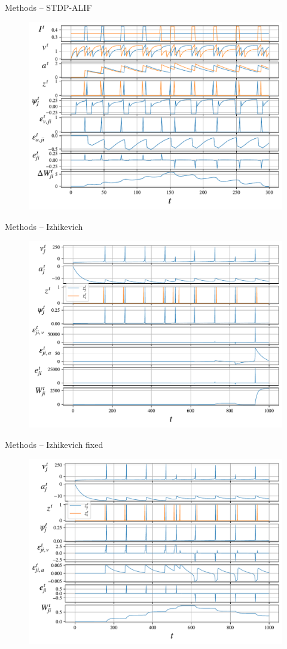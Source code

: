\documentclass[t]{beamer}
\begin{document}
\begin{frame}{Methods -- STDP-ALIF}
  \begin{figure}[!ht]
    \centering
    \includegraphics[width=.8\linewidth]{stdpalif}
  \end{figure}
\end{frame}
\begin{frame}{Methods -- Izhikevich}
  \begin{figure}[!ht]
    \centering
    \includegraphics[width=0.8\linewidth]{demo_izh}
  \end{figure}
\end{frame}

\begin{frame}{Methods -- Izhikevich fixed}
  \begin{figure}[!ht]
    \centering
    \includegraphics[width=0.8\linewidth]{demo_izh_corrected}
  \end{figure}
\end{frame}
\end{document}
